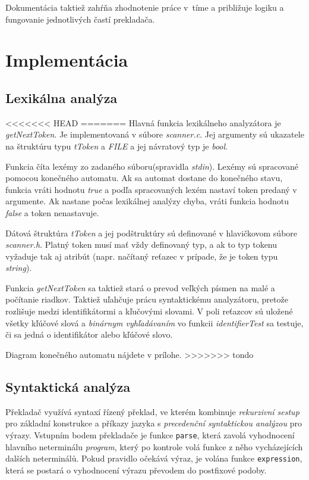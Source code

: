 \documentclass{article}
\begin{document}
        Dokumentácia taktiež zahŕňa zhodnotenie práce v~tíme a približuje logiku a fungovanie
        jednotlivých častí prekladača.

    \section{Implementácia}

        \subsection{Lexikálna analýza}
<<<<<<< HEAD
=======
        Hlavná funkcia lexikálneho analyzátora je \emph{getNextToken}. Je implementovaná v súbore \emph{scanner.c}.
        Jej argumenty sú ukazatele na štruktúru typu \emph{tToken} a \emph{FILE} a jej návratový typ je \emph{bool}. 

        Funkcia číta lexémy zo zadaného súboru(spravidla \emph{stdin}). Lexémy sú spracované pomocou konečného automatu. 
        Ak sa automat dostane do konečného stavu, funkcia vráti hodnotu \emph{true} a podľa spracovaných lexém nastaví
        token predaný v argumente. Ak nastane počas lexikálnej analýzy chyba, vráti funkcia hodnotu \emph{false} a 
        token nenastavuje. 

        Dátová štruktúra \emph{tToken} a jej podštruktúry sú definované v hlavičkovom súbore \emph{scanner.h}. 
        Platný token musí mať vždy definovaný typ, a ak to typ tokenu vyžaduje tak aj atribút 
        (napr. načítaný reťazec v prípade, že je token typu \emph{string}). 

        Funkcia \emph{getNextToken} sa taktiež stará o prevod veľkých písmen na malé a počítanie riadkov.
        Taktiež uľahčuje prácu syntaktickému analyzátoru, pretože rozlišuje medzi identifikátormi a kľučovými slovami.
        V poli reťazcov sú uložené všetky kľúčové slová a \emph{binárnym vyhľadávaním} vo funkcii \emph{identifierTest} 
        sa testuje, či sa jedná o identifikátor alebo kľúčové slovo.

        Diagram konečného automatu nájdete v prílohe.
>>>>>>> tondo

        \subsection{Syntaktická analýza}
            Překladač využívá syntaxí řízený překlad, ve kterém kombinuje \emph{rekurzivní sestup} pro základní konstrukce
            a příkazy jazyka s \emph{precedenční syntaktickou analýzou} pro výrazy.
            Vstupním bodem překladače je funkce \texttt{parse}, která zavolá vyhodnocení hlavního neterminálu \emph{program},
            který po kontrole volá funkce z něho vycházejících dalších neterminálů.
            Pokud pravidlo očekává výraz, je volána funkce \texttt{expression}, která se postará o vyhodnocení výrazu převodem
            do postfixové podoby.
            
\end{document}
